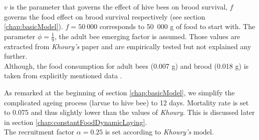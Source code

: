 			
			$v$ is the parameter that governs the effect of hive bees on brood survival, $f$ governs the food effect on brood survival respectively (see section \ref{chap:basicModel}). $f=50~000$ corresponds to 50~000 g of food to start with. The parameter $\phi=\frac{1}{9}$, the adult bee emerging factor is assumed. Those values are extracted from \textit{Khoury's} paper and are empirically tested but not explained any further.\\ Although, the food consumption for adult bees (0.007 g) and brood (0.018 g) is taken from explicitly mentioned data \cite{harbo93}.
					
			As remarked at the beginning of section \ref{chap:basicModel}, we simplify the complicated ageing process (larvae to hive bee) to 12 days. Mortality rate is set to 0.075 and thus slightly lower than the values of \textit{Khoury}. This is discussed later in section \ref{chap:constantFoodDynamicLaying}.
			\\
			The recruitment factor $\alpha = 0.25$ is set according to \textit{Khoury's} model.
			
		

